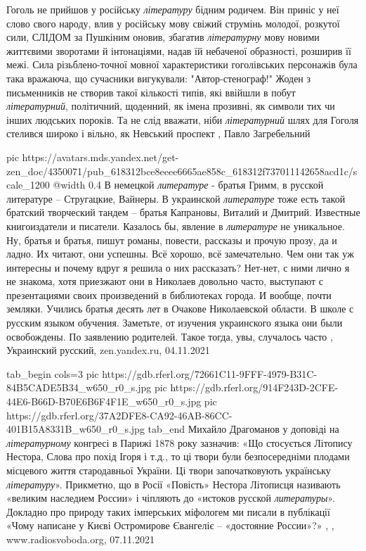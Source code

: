 Гоголь не прийшов у російську \emph{літературу} бідним родичем. Він приніс у
неї слово свого народу, влив у російську мову свіжий струмінь молодої, розкутої
сили, СЛІДОМ за Пушкіним оновив, збагатив \emph{літературну} мову новими
життєвими зворотами й інтонаціями, надав їй небаченої образності, розширив її
межі. Сила різьблено-точної мовної характеристики гоголівських персонажів була
така вражаюча, що сучасники вигукували: "Автор-стенограф!" Жоден з письменників
не створив такої кількості типів, які ввійшли в побут \emph{літературний},
політичний, щоденний, як імена прозивні, як символи тих чи інших людських
пороків.  Та не слід вважати, ніби \emph{літературний} шлях для Гоголя стелився
широко і вільно, як Невський проспект
, Павло Загребельний

\ifcmt
  pic https://avatars.mds.yandex.net/get-zen_doc/4350071/pub_618312bce8eeee6665ae858c_618312f737011142658acd1c/scale_1200
  @width 0.4
\fi
В немецкой \emph{литературе} - братья Гримм, в русской литературе – Стругацкие,
Вайнеры. В украинской \emph{литературе} тоже есть такой братский творческий
тандем – братья Капрановы, Виталий и Дмитрий. Известные книгоиздатели и
писатели.  Казалось бы, явление в \emph{литературе} не уникальное. Ну, братья и
братья, пишут романы, повести, рассказы и прочую прозу, да и ладно. Их читают,
они успешны. Всё хорошо, всё замечательно.  Чем они так уж интересны и почему
вдруг я решила о них рассказать? Нет-нет, с ними лично я не знакома, хотя
приезжают они в Николаев довольно часто, выступают с презентациями своих
произведений в библиотеках города. И вообще, почти земляки. Учились братья
десять лет в Очакове Николаевской области. В школе с русским языком обучения.
Заметьте, от изучения украинского языка они были освобождены. По заявлению
родителей. Такое тогда, увы, случалось часто
, Украинский русский, zen.yandex.ru, 04.11.2021


\ifcmt
  tab_begin cols=3
     pic https://gdb.rferl.org/72661C11-9FFF-4979-B31C-84B5CADE5B34_w650_r0_s.jpg
		 pic https://gdb.rferl.org/914F243D-2CFE-44E6-B66D-B70E6B6F4F1E_w650_r0_s.jpg
     pic https://gdb.rferl.org/37A2DFE8-CA92-46AB-86CC-401B15A8331B_w650_r0_s.jpg
  tab_end
\fi
Михайло Драгоманов у доповіді на \emph{літературному} конгресі в Парижі 1878 року
зазначив: «Що стосується Літопису Нестора, Слова про похід Ігоря і т.д., то ці
твори були безпосередніми плодами місцевого життя стародавньої України. Ці
твори започатковують українську \emph{літературу}».
Прикметно, що в Росії «Повість» Нестора Літописця називають «великим наследием
России» і чіпляють до «истоков русской \emph{литературы}». Докладно про природу таких
імперських міфологем ми писали в публікації «Чому написане у Києві Остромирове
Євангеліє – «достояние России»?»
, 
, www.radiosvoboda.org, 07.11.2021

